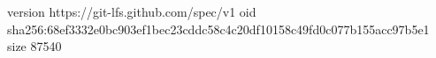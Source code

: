 version https://git-lfs.github.com/spec/v1
oid sha256:68ef3332e0bc903ef1bec23cddc58c4c20df10158c49fd0c077b155acc97b5e1
size 87540
